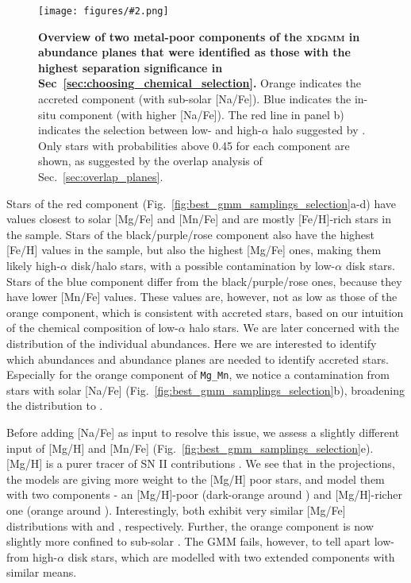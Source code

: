 \documentclass[fleqn,usenatbib]{mnras}
\newcommand{\codeicon}{{\faCloudDownload}}
\newcommand{\codelink}[1]{\href{https://github.com/svenbuder/buder_galah_accreted_chemistry/tree/main/figures/#1.ipynb}{\codeicon}\,\,}
\newcommand{\oscaption}[2]{\caption{#2 \codelink{#1}}}
\newcommand{\figuretextwidth}[4]{\begin{figure*} \centering \texttt{[image: figures/\#2.png]}\oscaption{#3}{#4}\label{fig:#2} \end{figure*}}
\begin{document}
\figuretextwidth{17cm}{nafe_mgmn_overview}{chronochemodynamic_comparison}{
\textbf{Overview of two metal-poor components of the \textsc{xdgmm} in abundance planes that were identified as those with the highest separation significance in Sec~\ref{sec:choosing_chemical_selection}.}
Orange indicates the accreted component (with sub-solar [Na/Fe]).
Blue indicates the in-situ component (with higher [Na/Fe]).
The red line in panel b) indicates the selection between low- and high-$\alpha$ halo suggested by \citet{Nissen2010}.
Only stars with probabilities above 0.45 for each component are shown, as suggested by the overlap analysis of Sec.~\ref{sec:overlap_planes}.
}

Stars of the red component (Fig.~\ref{fig:best_gmm_samplings_selection}a-d) have values closest to solar [Mg/Fe] and [Mn/Fe] and are mostly [Fe/H]-rich stars in the sample. Stars of the black/purple/rose component also have the highest [Fe/H] values in the sample, but also the highest [Mg/Fe] ones, making them likely high-$\alpha$ disk/halo stars, with a possible contamination by low-$\alpha$ disk stars. Stars of the blue component differ from the black/purple/rose ones, because they have lower [Mn/Fe] values. These values are, however, not as low as those of the orange component, which is consistent with accreted stars, based on our intuition of the chemical composition of low-$\alpha$ halo stars. We are later concerned with the distribution of the individual abundances. Here we are interested to identify which abundances and abundance planes are needed to identify accreted stars. Especially for the orange component of \texttt{Mg\_Mn}, we notice a contamination from stars with solar [Na/Fe] (Fig.~\ref{fig:best_gmm_samplings_selection}b), broadening the distribution to .

Before adding [Na/Fe] as input to resolve this issue, we assess a slightly different input of [Mg/H] and [Mn/Fe] (Fig.~\ref{fig:best_gmm_samplings_selection}e). [Mg/H] is a purer tracer of SN II contributions \citep{Kobayashi2020, Feuillet2021}. We see that in the projections, the models are giving more weight to the [Mg/H] poor stars, and model them with two components - an [Mg/H]-poor (dark-orange around ) and [Mg/H]-richer one (orange around ). Interestingly, both exhibit very similar [Mg/Fe] distributions with  and , respectively. Further, the orange component is now slightly more confined to sub-solar . The GMM fails, however, to tell apart low- from high-$\alpha$ disk stars, which are modelled with two extended components with similar means.
\end{document}
